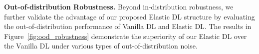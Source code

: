 
















\textbf{Out-of-distribution Robustness.} Beyond in-distribution robustness, we further validate the advantage of our proposed Elastic DL structure by evaluating the out-of-distribution performance of Vanilla DL and Elastic DL. The results in Figure~\ref{fig:ood_robustness} demonstrate the superiority of our Elastic DL over the Vanilla  DL under various types of out-of-distribution noise.




